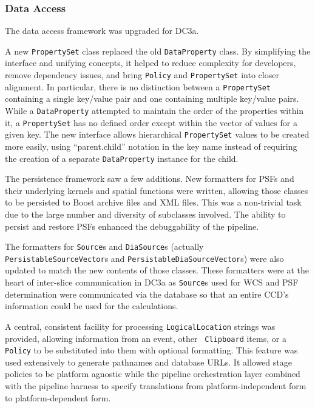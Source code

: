 
\subsubsection{Data Access}

The data access framework was upgraded for DC3a.

A new {\tt PropertySet} class replaced the old {\tt DataProperty} class.
By simplifying the interface and unifying concepts, it helped to reduce
complexity for developers, remove dependency issues, and bring
{\tt Policy} and {\tt PropertySet} into closer alignment.  In
particular, there is no distinction between a {\tt PropertySet}
containing a single key/value pair and one containing multiple key/value
pairs.  While a {\tt DataProperty} attempted to maintain the order of
the properties within it, a {\tt PropertySet} has no defined order
except within the vector of values for a given key.  The new interface
allows hierarchical {\tt PropertySet} values to be created more easily,
using ``parent.child'' notation in the key name instead of requiring the
creation of a separate {\tt DataProperty} instance for the child.

The persistence framework saw a few additions.  New formatters for PSFs
and their underlying kernels and spatial functions were written,
allowing those classes to be persisted to Boost archive files and XML
files.  This was a non-trivial task due to the large number and
diversity of subclasses involved.  The ability to persist and restore
PSFs enhanced the debuggability of the pipeline.

The formatters for {\tt Source}s and {\tt DiaSource}s (actually {\tt
PersistableSourceVector}s and \hfil\break\texttt{PersistableDiaSourceVector}s) were
also updated to match the new contents of those classes.  These
formatters were at the heart of inter-slice communication in DC3a as
{\tt Source}s used for WCS and PSF determination were communicated via
the database so that an entire CCD's information could be used for the
calculations.

A central, consistent facility for processing {\tt LogicalLocation}
strings was provided, allowing information from an event, other {\tt
Clipboard} items, or a {\tt Policy} to be substituted into them with
optional formatting.  This feature was used extensively to generate
pathnames and database URLs.  It allowed stage policies to be
platform agnostic while the pipeline orchestration layer combined
with the pipeline harness to specify translations from
platform-independent form to platform-dependent form.

